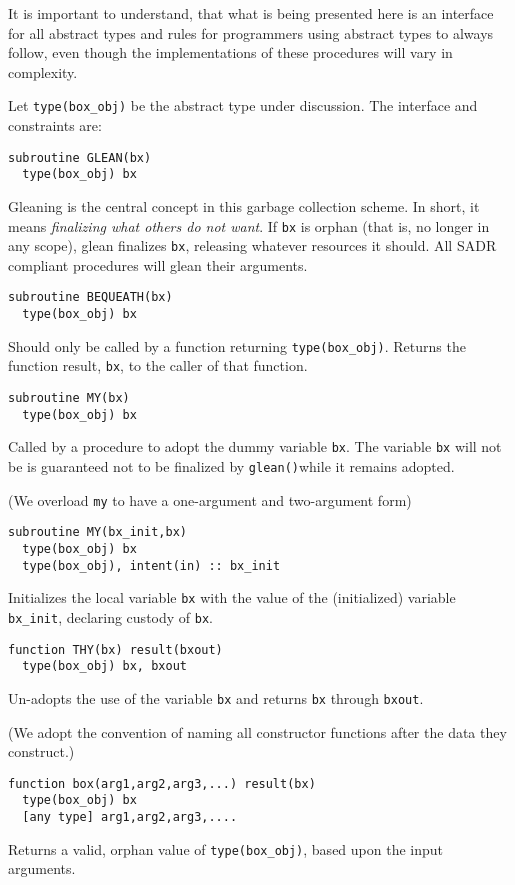 It is important to understand, that what is being presented here is an
interface for all abstract types and rules for programmers using
abstract types to always follow, even though the implementations of
these procedures will vary in complexity.

Let \verb+type(box_obj)+ be the abstract type under discussion.  The interface
and constraints are:

\begin{verbatim}
subroutine GLEAN(bx)
  type(box_obj) bx
\end{verbatim}
Gleaning is the central concept in this garbage collection scheme.  In
short, it means {\em finalizing what others do not want}.  If
\verb+bx+ is orphan (that is, no longer in any scope), glean finalizes
\verb+bx+, releasing whatever resources it should.  All SADR compliant
procedures will glean their arguments.

\begin{verbatim}
subroutine BEQUEATH(bx)
  type(box_obj) bx
\end{verbatim}
Should only be
called by a function returning \verb+type(box_obj)+.
Returns the function result, \verb+bx+, to the caller of that function.

\begin{verbatim}
subroutine MY(bx)
  type(box_obj) bx
\end{verbatim}
Called by a procedure to adopt the dummy variable \verb+bx+.  The
variable \verb+bx+ will not be is guaranteed not to be finalized 
by \verb+glean()+while it remains adopted.

(We overload \verb+my+ to have a one-argument and two-argument form)
\begin{verbatim}
subroutine MY(bx_init,bx)
  type(box_obj) bx
  type(box_obj), intent(in) :: bx_init
\end{verbatim}
Initializes the local variable \verb+bx+ with the value of the 
(initialized) variable \verb+bx_init+, declaring custody of
\verb+bx+.

\begin{verbatim}
function THY(bx) result(bxout)
  type(box_obj) bx, bxout
\end{verbatim}
Un-adopts the use of the variable \verb+bx+ and returns 
\verb+bx+ through \verb+bxout+.

(We adopt the convention of naming all constructor functions after the
data they construct.)
\begin{verbatim}
function box(arg1,arg2,arg3,...) result(bx)
  type(box_obj) bx
  [any type] arg1,arg2,arg3,....
\end{verbatim}
Returns a valid, orphan value of \verb+type(box_obj)+, based upon
the input arguments.

